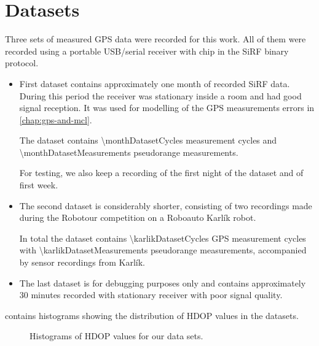 \chapter{Datasets}
\label{chap:datasets}

Three sets of measured GPS data were recorded for this work.
All of them were recorded using a portable USB/serial receiver with \sirf chip
in the SiRF binary protocol.

\begin{itemize}

\item
First dataset contains approximately one month of recorded SiRF data.
During this period the receiver was stationary inside a room and had good signal 
reception. 
It was used for modelling of the GPS measurements errors in \cref{chap:gps-and-mcl}.

The dataset contains \num{\monthDatasetCycles} measurement cycles and
\num{\monthDatasetMeasurements} pseudorange measurements.

For testing, we also keep a recording of the first night of the dataset and of first week.

\item
The second dataset is considerably shorter, consisting of two recordings made during
the Robotour competition \cite{robotour} on a Roboauto Karlík \cite{karlik} robot.

In total the dataset contains \num{\karlikDatasetCycles} GPS measurement cycles with
\num{\karlikDatasetMeasurements} pseudorange measurements, accompanied by sensor recordings from Karlík.

\item
The last dataset is for debugging purposes only and contains approximately
30 minutes recorded with stationary receiver with poor signal quality.

\end{itemize}

 contains histograms showing the distribution of HDOP values in the datasets.

\begin{figure}[htp]
	\centering
	\noindent{}
	\caption{Histograms of HDOP values for our data sets.}
	\label{fig:hdop-hist}
\end{figure}


